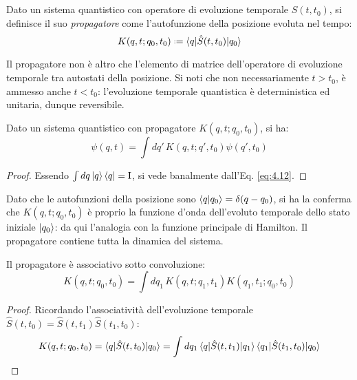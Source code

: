 \begin{definition}
	Dato un sistema quantistico con operatore di evoluzione temporale $ \hat{S}(t,t_0) $, si definisce il suo \textit{propagatore} come l'autofunzione della posizione evoluta nel tempo:
	\begin{equation}
		K(q,t ; q_0,t_0) \defeq \braket{q | \hat{S}(t,t_0) | q_0}
		\label{eq:4.13}
	\end{equation}
\end{definition}

Il propagatore non è altro che l'elemento di matrice dell'operatore di evoluzione temporale tra autostati della posizione. Si noti che non necessariamente $ t > t_0 $, è ammesso anche $ t < t_0 $: l'evoluzione temporale quantistica è deterministica ed unitaria, dunque reversibile.

\begin{proposition}
	Dato un sistema quantistico con propagatore $ K(q,t ; q_0,t_0) $, si ha:
	\begin{equation}
		\psi(q,t) = \int dq'\, K(q,t ; q',t_0) \psi(q',t_0)
		\label{eq:4.14}
	\end{equation}
\end{proposition}
\begin{proof}
	Essendo $ \int dq \ket{q}\bra{q} = \mathrm{I} $, si vede banalmente dall'Eq. \ref{eq:4.12}.
\end{proof}

Dato che le autofunzioni della posizione sono $ \braket{q | q_0} = \delta(q - q_0) $, si ha la conferma che $ K(q,t ; q_0,t_0) $ è proprio la funzione d'onda dell'evoluto temporale dello stato iniziale $ \ket{q_0} $: da qui l'analogia con la funzione principale di Hamilton. Il propagatore contiene tutta la dinamica del sistema.

\begin{proposition}
	Il propagatore è associativo sotto convoluzione:
	\begin{equation}
		K(q,t ; q_0,t_0) = \int dq_1\, K(q,t ; q_1,t_1) K(q_1,t_1 ; q_0,t_0)
		\label{eq:4.15}
	\end{equation}
\end{proposition}
\begin{proof}
	Ricordando l'associatività dell'evoluzione temporale $ \hat{S}(t,t_0) = \hat{S}(t,t_1) \hat{S}(t_1,t_0) $:
	\begin{equation*}
		K(q,t ; q_0,t_0) = \braket{q | \hat{S}(t,t_0) | q_0} = \int dq_1 \braket{q | \hat{S}(t,t_1) | q_1} \braket{q_1 | \hat{S}(t_1,t_0) | q_0}
	\end{equation*}
\end{proof}

